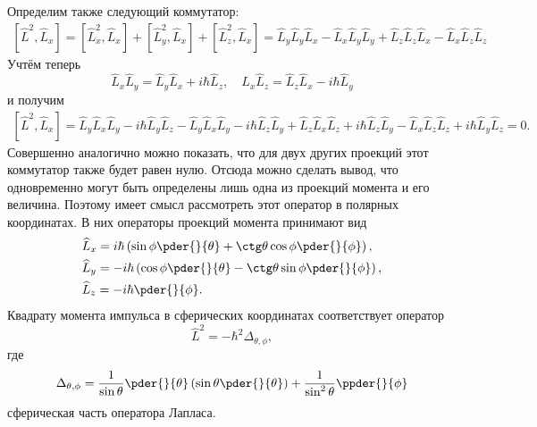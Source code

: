 Определим также следующий коммутатор:
\begin{gather*}
    \left[ \hat{L}^2, \hat{L}_x \right] = \left[ \hat{L}_x^2, \hat{L}_x \right]
    + \left[ \hat{L}_y^2, \hat{L}_x \right] +
    \left[ \hat{L}_z^2, \hat{L}_x \right] =
    \hat{L}_y\hat{L}_y\hat{L}_x - \hat{L}_x\hat{L}_y\hat{L}_y +
    \hat{L}_z\hat{L}_z\hat{L}_x - \hat{L}_x\hat{L}_z\hat{L}_z
\end{gather*}
Учтём теперь
\[
    \hat{L}_x\hat{L}_y = \hat{L}_y\hat{L}_x + i\hbar\hat{L}_z, \quad
    \hat{L}_x\hat{L}_z = \hat{L}_z\hat{L}_x - i\hbar\hat{L}_y
\]
и получим
\begin{gather*}
    \left[ \hat{L}^2, \hat{L}_x \right] =
    \hat{L}_y\hat{L}_x\hat{L}_y - i\hbar\hat{L}_y\hat{L}_z -
    \hat{L}_y\hat{L}_x\hat{L}_y - i\hbar\hat{L}_z\hat{L}_y +
    \hat{L}_z\hat{L}_x\hat{L}_z + i\hbar\hat{L}_z\hat{L}_y -
    \hat{L}_x\hat{L}_z\hat{L}_z + i\hbar\hat{L}_y\hat{L}_z = 0.
\end{gather*}
Совершенно аналогично можно показать, что для двух других проекций этот
коммутатор также будет равен нулю. Отсюда можно сделать вывод, что одновременно
могут быть определены лишь одна из проекций момента и его величина. Поэтому
имеет смысл рассмотреть этот оператор в полярных координатах. В них операторы
проекций момента принимают вид
\begin{align*}
    & \hat{L}_x = i\hbar\left(\sin\phi\pder{}{\theta} +
        \ctg\theta\cos\phi\pder{}{\phi}\right), \\
    & \hat{L}_y = -i\hbar\left(\cos\phi\pder{}{\theta} -
        \ctg\theta\sin\phi\pder{}{\phi}\right), \\
    & \hat{L}_z = -i\hbar\pder{}{\phi}.
\end{align*}
Квадрату момента импульса в сферических координатах соответствует оператор
\[
    \hat{L}^2 = -\hbar^2\Delta_{\theta,\phi},
\]
где
\[
    \Delta_{\theta,\phi} = \frac{1}{\sin\theta}\pder{}{\theta}
        \left(\sin\theta\pder{}{\theta}\right) +
        \frac{1}{\sin^2\theta}\ppder{}{\phi}
\]
сферическая часть оператора Лапласа.

